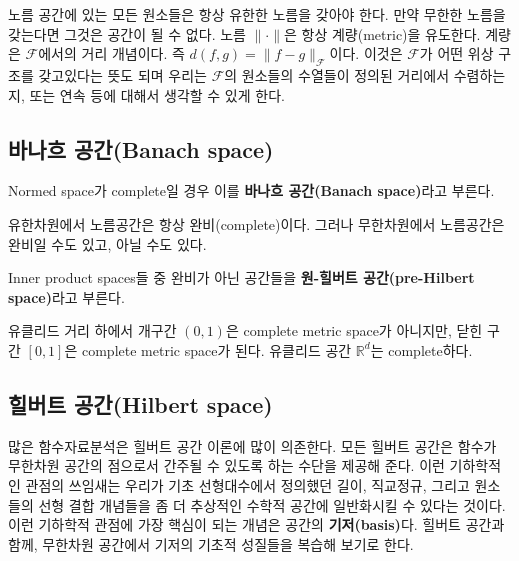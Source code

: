 \documentclass[b5paper,]{scrbook}
\theoremstyle{plain}
\theoremstyle{definition}
\numberwithin{equation}{section}
\let\BeginKnitrBlock\begin \let\EndKnitrBlock\end
\begin{document}
노름 공간에 있는 모든 원소들은 항상 유한한 노름을 갖아야 한다. 만약 무한한 노름을 갖는다면 그것은 공간이 될 수 없다. 노름 \(\|\cdot\|\)은 항상 계량(metric)을 유도한다. 계량은 \(\mathcal{F}\)에서의 거리 개념이다. 즉 \(d(f,g)=\| f-g\|_{\mathcal{F}}\)이다. 이것은 \(\mathcal{F}\)가 어떤 위상 구조를 갖고있다는 뜻도 되며 우리는 \(\mathcal{F}\)의 원소들의 수열들이 정의된 거리에서 수렴하는지, 또는 연속 등에 대해서 생각할 수 있게 한다.

\hypertarget{-banach-space}{%
\subsection{바나흐 공간(Banach space)}\label{-banach-space}}

\BeginKnitrBlock{definition}[힐버트 공간]
\protect\hypertarget{def:unnamed-chunk-27}{}{\label{def:unnamed-chunk-27} {} }Normed space가 complete일 경우 이를 \textbf{바나흐 공간(Banach space)}라고 부른다.
\EndKnitrBlock{definition}

유한차원에서 노름공간은 항상 완비(complete)이다. 그러나 무한차원에서 노름공간은 완비일 수도 있고, 아닐 수도 있다.

\BeginKnitrBlock{definition}[원-힐버트 공간]
\protect\hypertarget{def:unnamed-chunk-28}{}{\label{def:unnamed-chunk-28} {} }Inner product spaces들 중 완비가 아닌 공간들을 \textbf{원-힐버트 공간(pre-Hilbert space)}라고 부른다.
\EndKnitrBlock{definition}

\BeginKnitrBlock{example}[원-힐버트 공간의 예]
\protect\hypertarget{exm:unnamed-chunk-29}{}{\label{exm:unnamed-chunk-29} {} }유클리드 거리 하에서 개구간 \((0,1)\)은 complete metric space가 아니지만, 닫힌 구간 \([0,1]\)은 complete metric space가 된다. 유클리드 공간 \(\mathbb{R}^{d}\)는 complete하다.
\EndKnitrBlock{example}

\hypertarget{-hilbert-space}{%
\subsection{힐버트 공간(Hilbert space)}\label{-hilbert-space}}

많은 함수자료분석은 힐버트 공간 이론에 많이 의존한다. 모든 힐버트 공간은 함수가 무한차원 공간의 점으로서 간주될 수 있도록 하는 수단을 제공해 준다. 이런 기하학적인 관점의 쓰임새는 우리가 기초 선형대수에서 정의했던 길이, 직교정규, 그리고 원소들의 선형 결합 개념들을 좀 더 추상적인 수학적 공간에 일반화시킬 수 있다는 것이다. 이런 기하학적 관점에 가장 핵심이 되는 개념은 공간의 \textbf{기저(basis)}다. 힐버트 공간과 함께, 무한차원 공간에서 기저의 기초적 성질들을 복습해 보기로 한다.
\end{document}
